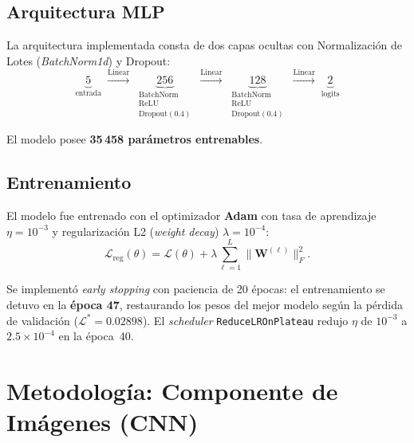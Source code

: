 \documentclass[12pt, a4paper]{article}
\newcommand{\W}{\mathbf{W}}
\newcommand{\Loss}{\mathcal{L}}
\begin{document}
\subsection{Arquitectura MLP}

La arquitectura implementada consta de dos capas ocultas con
Normalización de Lotes (\textit{BatchNorm1d}) y Dropout:
\begin{equation}
  \underbrace{5}_{\text{entrada}}
  \;\xrightarrow{\mathrm{Linear}}\;
  \underbrace{256}_{\substack{\mathrm{BatchNorm}\\\mathrm{ReLU}\\\mathrm{Dropout}(0.4)}}
  \;\xrightarrow{\mathrm{Linear}}\;
  \underbrace{128}_{\substack{\mathrm{BatchNorm}\\\mathrm{ReLU}\\\mathrm{Dropout}(0.4)}}
  \;\xrightarrow{\mathrm{Linear}}\;
  \underbrace{2}_{\text{logits}}
  \label{eq:mlp_arch}
\end{equation}

El modelo posee \textbf{35\,458 parámetros entrenables}.

\subsection{Entrenamiento}

El modelo fue entrenado con el optimizador \textbf{Adam}
\citep{kingma2015} con tasa de aprendizaje $\eta = 10^{-3}$ y
regularización L2 (\textit{weight decay}) $\lambda = 10^{-4}$:
\begin{equation}
  \Loss_{\mathrm{reg}}(\theta) = \Loss(\theta)
  + \lambda \sum_{\ell=1}^{L} \|\W^{(\ell)}\|_F^2.
  \label{eq:l2_reg}
\end{equation}

Se implementó \textit{early stopping} con paciencia de 20 épocas:
el entrenamiento se detuvo en la \textbf{época 47}, restaurando los
pesos del mejor modelo según la pérdida de validación
($\Loss^* = 0.02898$). El \textit{scheduler} \texttt{ReduceLROnPlateau}
redujo $\eta$ de $10^{-3}$ a $2.5 \times 10^{-4}$ en la época~40.

\section{Metodología: Componente de Imágenes (CNN)}
\label{sec:metodo_imagenes}
\end{document}
